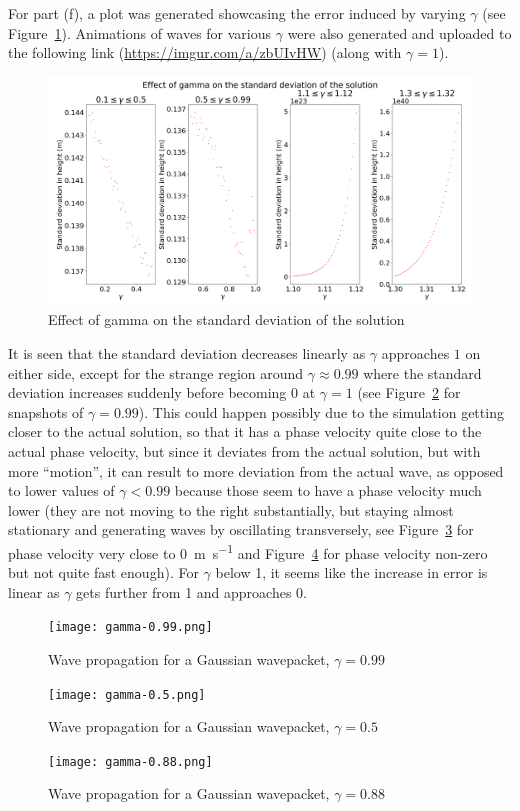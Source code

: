 \documentclass[hyphens,twocolumn,nobalancelastpage,aps,10pt,citeautoscript,longbibliography]{revtex4-2}
\begin{document}
For part (f), a plot was generated showcasing the error induced by varying
$\gamma$ (see Figure~\ref{fig:gamma_std}). Animations of waves for various
$\gamma$ were also generated and uploaded to the following link
(\url{https://imgur.com/a/zbUIvHW}) (along with $\gamma = 1$).
\begin{figure}[htpb]
	\centering
	\includegraphics[width=\linewidth]{gamma_std.png}
	\caption{Effect of gamma on the standard deviation of the solution}%
	\label{fig:gamma_std}
\end{figure}

It is seen that the standard deviation decreases linearly as $\gamma$
approaches $1$ on either side, except for the strange region around $\gamma
\approx 0.99$ where the standard deviation increases suddenly before becoming 0
at $\gamma = 1$ (see Figure~\ref{fig:gamma-0.99} for snapshots of $\gamma =
0.99$). This could happen possibly due to the simulation getting closer to the
actual solution, so that it has a phase velocity quite close to the actual
phase velocity, but since it deviates from the actual solution, but with more
``motion'', it can result to more deviation from the actual wave, as opposed to
lower values of $\gamma < 0.99$ because those seem to have a phase velocity
much lower (they are not moving to the right substantially, but staying almost
stationary and generating waves by oscillating transversely, see
Figure~\ref{fig:gamma-0.5} for phase velocity very close to
\qty{0}{\metre\per\second} and Figure~\ref{fig:gamma-0.88} for phase velocity
non-zero but not quite fast enough). For $\gamma$ below 1, it seems like the
increase in error is linear as $\gamma$ gets further from 1 and approaches $0$.
\begin{figure}[htpb]
	\centering
	\texttt{[image: gamma-0.99.png]}
	\caption{Wave propagation for a Gaussian wavepacket, $\gamma = 0.99$}%
	\label{fig:gamma-0.99}
\end{figure}
\begin{figure}[htpb]
	\centering
	\texttt{[image: gamma-0.5.png]}
	\caption{Wave propagation for a Gaussian wavepacket, $\gamma = 0.5$}%
	\label{fig:gamma-0.5}
\end{figure}
\begin{figure}[htpb]
	\centering
	\texttt{[image: gamma-0.88.png]}
	\caption{Wave propagation for a Gaussian wavepacket, $\gamma = 0.88$}%
	\label{fig:gamma-0.88}
\end{figure}
\end{document}
